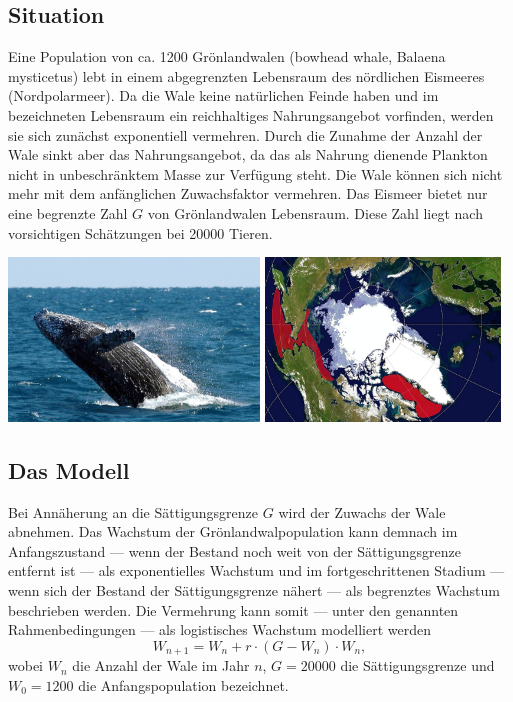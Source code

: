 \documentclass[%
<<<<<<< Updated upstream
11pt,%
twoside,%
titlepage,%
german,%
headsepline%
]{scrartcl}
\begin{document}
\subsection{Situation}
Eine
Population von ca. 1200 Grönlandwalen (bowhead whale, Balaena mysticetus) lebt in einem abgegrenzten Lebensraum des nördlichen Eismeeres (Nordpolarmeer). Da die Wale keine natürlichen Feinde haben und im bezeichneten Lebensraum ein reichhaltiges Nahrungsangebot vorfinden, werden sie sich zunächst exponentiell vermehren. Durch die Zunahme der Anzahl der Wale sinkt aber das Nahrungsangebot, da das als Nahrung dienende Plankton nicht in unbeschränktem Masse zur Verfügung steht. Die Wale können sich nicht mehr mit dem anfänglichen Zuwachsfaktor vermehren. Das Eismeer bietet nur eine begrenzte Zahl $G$ von Grönlandwalen Lebensraum. Diese Zahl liegt nach vorsichtigen Schätzungen bei 20000 Tieren.\\[2ex]

\begin{center}
\includegraphics[width=0.5\textwidth]{pictures/groenlandwale.jpeg}
\includegraphics[width=0.4685\textwidth]{pictures/groenlandwalegebiet.jpg}
\end{center}


\subsection{Das Modell}
Bei Annäherung an die Sättigungsgrenze $G$ wird der Zuwachs der Wale abnehmen. Das Wachstum der Grönlandwalpopulation kann demnach im Anfangszustand --- wenn der Bestand noch weit von der Sättigungsgrenze entfernt ist --- als exponentielles Wachstum und im fortgeschrittenen Stadium --- wenn sich der Bestand der Sättigungsgrenze nähert --- als begrenztes Wachstum beschrieben werden. Die Vermehrung kann somit --- unter den genannten Rahmenbedingungen --- als logistisches Wachstum modelliert werden
$$W_{n+1}=W_n+r\cdot (G-W_n)\cdot W_n,$$
wobei $W_n$ die Anzahl der Wale im Jahr $n$, $G=20000$ die Sättigungsgrenze und $W_0=1200$ die Anfangspopulation bezeichnet.
\end{document}

